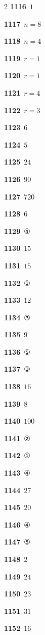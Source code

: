 \documentclass[10pt,a4paper]{article}
\begin{document}
\begin{multicols}{2}
\noindent\textbf{1116}\ $1$\par
\noindent\textbf{1117}\ $n=8$\par
\noindent\textbf{1118}\ $n=4$\par
\noindent\textbf{1119}\ $r=1$\par
\noindent\textbf{1120}\ $r=1$\par
\noindent\textbf{1121}\ $r=4$\par
\noindent\textbf{1122}\ $r=3$\par
\noindent\textbf{1123}\ $6$\par
\noindent\textbf{1124}\ $5$\par
\noindent\textbf{1125}\ $24$\par
\noindent\textbf{1126}\ $90$\par
\noindent\textbf{1127}\ $720$\par
\noindent\textbf{1128}\ $6$\par
\noindent\textbf{1129}\ ④\par
\noindent\textbf{1130}\ $15$\par
\noindent\textbf{1131}\ $15$\par
\noindent\textbf{1132}\ ①\par
\noindent\textbf{1133}\ $12$\par
\noindent\textbf{1134}\ ③\par
\noindent\textbf{1135}\ $9$\par
\noindent\textbf{1136}\ ⑤\par
\noindent\textbf{1137}\ ③\par
\noindent\textbf{1138}\ $16$\par
\noindent\textbf{1139}\ $8$\par
\noindent\textbf{1140}\ $100$\par
\noindent\textbf{1141}\ ②\par
\noindent\textbf{1142}\ ①\par
\noindent\textbf{1143}\ ④\par
\noindent\textbf{1144}\ $27$\par
\noindent\textbf{1145}\ $20$\par
\noindent\textbf{1146}\ ④\par
\noindent\textbf{1147}\ ⑤\par
\noindent\textbf{1148}\ $2$\par
\noindent\textbf{1149}\ $24$\par
\noindent\textbf{1150}\ $23$\par
\noindent\textbf{1151}\ $31$\par
\noindent\textbf{1152}\ $16$\par

\end{multicols}
\end{document}
